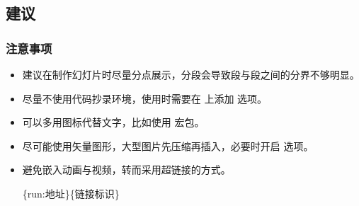 \begin{shadedsection}
\section{建议}

\begin{frame}
  \frametitle{注意事项}
  \begin{itemize}
    \item 建议在制作幻灯片时尽量分点展示，分段会导致段与段之间的分界不够明显。
    \item 尽量不使用代码抄录环境，使用时需要在  上添加  选项。
    \item 可以多用图标代替文字，比如使用  宏包。
    \item 尽可能使用矢量图形，大型图片先压缩再插入，必要时开启  选项。
    \item 避免嵌入动画与视频，转而采用超链接的方式。
    \begin{center}
      \ttfamily
      \{run:地址\}\{链接标识\}
    \end{center}
  \end{itemize}
\end{frame}

\end{shadedsection}
